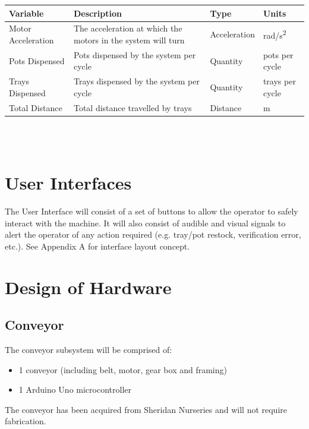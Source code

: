 \documentclass[12pt, titlepage]{article}
\begin{document}
\begin{tabular}{ |p{3cm}|p{8.9cm}|p{2.1cm}|p{1cm}| }
  \hline
  Variable & Description & Type & Units\\
  \hline
  Motor Acceleration & The acceleration at which the motors in the system will turn
   & Acceleration & rad/s\textsuperscript{2}\\
  \hline
  Pots Dispensed & Pots dispensed by the system per cycle
   & Quantity & pots per cycle\\
  \hline
  Trays Dispensed & Trays dispensed by the system per cycle
   & Quantity &  trays per cycle\\
  \hline
  Total Distance & Total distance travelled by trays
   & Distance & m\\
  
  \hline
 \end{tabular}\\\\

\section{User Interfaces}


The User Interface will consist of a set of buttons to allow the operator to safely 
interact with the machine. It will also consist of audible and visual signals to alert
the operator of any action required (e.g. tray/pot restock, verification error, etc.).
See Appendix A for interface layout concept.

\section{Design of Hardware}

\subsection{Conveyor}

The conveyor subsystem will be comprised of:
\begin{itemize}
  \item 1 conveyor (including belt, motor, gear box and framing)
  \item 1 Arduino Uno microcontroller
  
\end{itemize}
The conveyor has been acquired from Sheridan Nurseries and will not require fabrication.
\end{document}
